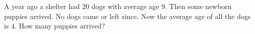 A year ago a shelter had $20$ dogs with average age $9$. Then some newborn puppies arrived. No dogs came or left since. Now the average age of all the dogs is $4$. How many puppies arrived?
